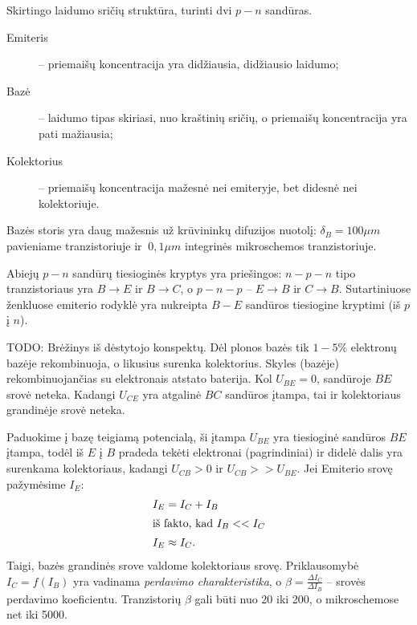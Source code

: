 \begin{defn}
  Skirtingo laidumo sričių struktūra, turinti dvi $p-n$ sandūras.
\end{defn}

\begin{description}
  \item[Emiteris] – priemaišų koncentracija yra didžiausia, didžiausio
    laidumo;
  \item[Bazė] – laidumo tipas skiriasi, nuo kraštinių sričių, o priemaišų
    koncentracija yra pati mažiausia;
  \item[Kolektorius] – priemaišų koncentracija mažesnė nei emiteryje, bet
    didesnė nei kolektoriuje.
\end{description}

Bazės storis yra daug mažesnis už krūvininkų difuzijos nuotolį:
$\delta_{B} = 100 \mu m$ pavieniame tranzistoriuje ir $~0,1 \mu m$
integrinės mikroschemos tranzistoriuje.

Abiejų $p-n$ sandūrų tiesioginės kryptys yra priešingos: $n-p-n$
tipo tranzistoriaus yra $B \to E$ ir $B \to C$, o $p-n-p$ –
$E \to B$ ir $C \to B$. Sutartiniuose ženkluose emiterio rodyklė yra
nukreipta $B-E$ sandūros tiesiogine kryptimi (iš $p$ į $n$).

TODO: Brėžinys iš dėstytojo konspektų.
Dėl plonos bazės tik $1-5\%$ elektronų bazėje rekombinuoja, o likusius
surenka kolektorius. Skyles (bazėje) rekombinuojančias su elektronais
atstato baterija. Kol $U_{BE} = 0$, sandūroje $BE$ srovė neteka. Kadangi
$U_{CE}$ yra atgalinė $BC$ sandūros įtampa, tai ir kolektoriaus
grandinėje srovė neteka.

Paduokime į bazę teigiamą potencialą, ši įtampa $U_{BE}$ yra tiesioginė
sandūros $BE$ įtampa, todėl iš $E$ į $B$ pradeda tekėti elektronai
(pagrindiniai) ir didelė dalis yra surenkama kolektoriaus, kadangi
$U_{CB} > 0$ ir $U_{CB} >> U_{BE}$. Jei Emiterio srovę pažymėsime $I_{E}$:
\begin{align*}
  I_{E} &= I_{C} + I_{B} \\
  \intertext{iš fakto, kad $I_{B} << I_{C}$}
  I_{E} &\approx I_{C}. \\
\end{align*}
Taigi, bazės grandinės srove valdome kolektoriaus srovę. Priklausomybė
$I_{C} = f(I_{B})$ yra vadinama \emph{perdavimo charakteristika}, o
$\beta = \frac{\Delta I_{C}}{\Delta I_{B}}$ – srovės perdavimo
koeficientu. Tranzistorių $\beta$ gali būti nuo 20 iki 200, o
mikroschemose net iki 5000.

